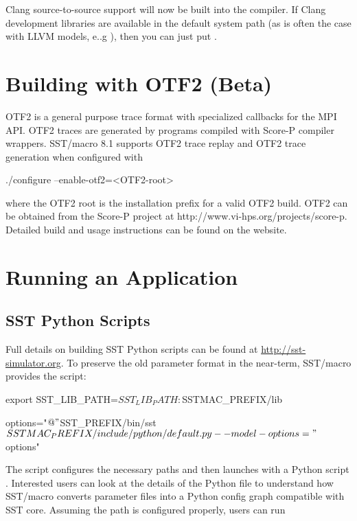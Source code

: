 Clang source-to-source support will now be built into the  compiler. 
If Clang development libraries are available in the default system path (as is often the case with LLVM models, e..g ),
then you can just put .

\section{Building with OTF2 (Beta)}
\label{sec:buildingOtf2}
OTF2 is a general purpose trace format with specialized callbacks for the MPI API. OTF2 traces are generated by programs compiled with Score-P compiler wrappers. SST/macro 8.1 supports OTF2 trace replay and OTF2 trace generation when configured with 

\begin{ViFile}
./configure --enable-otf2=<OTF2-root>	
\end{ViFile}
where the OTF2 root is the installation prefix for a valid OTF2 build. OTF2 can be obtained from the Score-P project at {http://www.vi-hps.org/projects/score-p}.
Detailed build and usage instructions can be found on the website.


\section{Running an Application}\label{sec:building:running}
\subsection{SST Python Scripts}
\label{subsec:SSTPythonScripts}

Full details on building SST Python scripts can be found at \url{http://sst-simulator.org}.  To preserve the old parameter format in the near-term, SST/macro provides the  script:

\begin{ViFile}
export SST_LIB_PATH=$SST_LIB_PATH:$SSTMAC_PREFIX/lib

options="$@"
$SST_PREFIX/bin/sst $SSTMAC_PREFIX/include/python/default.py --model-options="$options"
\end{ViFile}

The script configures the necessary paths and then launches with a Python script .  Interested users can look at the details of the Python file to understand how SST/macro converts parameter files into a Python config graph compatible with SST core.
Assuming the path is configured properly, users can run

